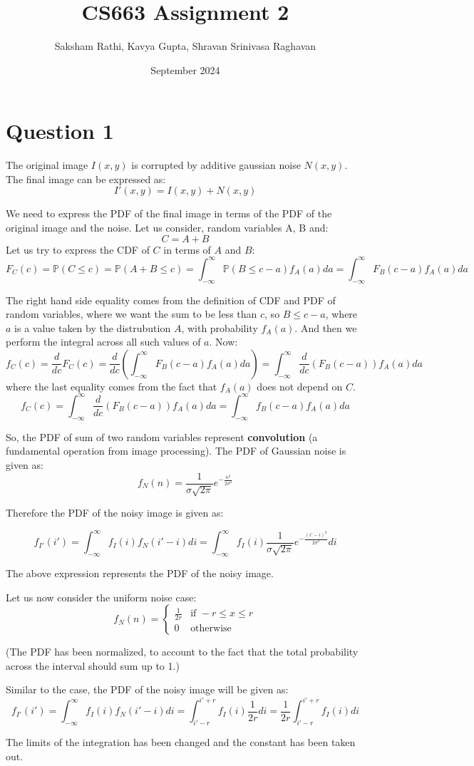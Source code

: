 \documentclass[12pt]{article}
\title{{\bf CS663 Assignment 2}}
\author{Saksham Rathi, Kavya Gupta, Shravan Srinivasa Raghavan}
\date{September 2024}
\begin{document}
\maketitle
\clearpage
\tableofcontents
\clearpage
\section*{Question 1}
The original image $I(x, y)$ is corrupted by additive gaussian noise $N(x, y)$. The final image can be expressed as:
\[I'(x, y) = I(x, y) + N(x, y)\]

We need to express the PDF of the final image in terms of the PDF of the original image and the noise. Let us consider, random variables A, B and:
\[C = A + B\]
Let us try to express the CDF of $C$ in terms of $A$ and $B$:
\[F_C(c) = \mathbb{P}(C \leq c) = \mathbb{P}(A+ B \leq c) = \int_{-\infty}^\infty \mathbb{P}(B \leq c - a)f_A(a)da = \int_{-\infty}^\infty F_B(c-a)f_A(a)da\]

The right hand side equality comes from the definition of CDF and PDF of random variables, where we want the sum to be less than $c$, so $B\leq c-a$, where $a$ is a value taken by the distrubution $A$, with probability $f_A(a)$. And then we perform the integral across all such values of $a$. Now:
\[f_C(c) = \frac{d}{dc}F_C(c) = \frac{d}{dc}\left(\int_{-\infty}^\infty F_B(c-a)f_A(a)da\right) = \int_{-\infty}^\infty \frac{d}{dc}\left(F_B(c-a)\right)f_A(a)da\]
where the last equality comes from the fact that $f_A(a)$ does not depend on $C$.
\[f_C(c) = \int_{-\infty}^\infty \frac{d}{dc}(F_B(c-a))f_A(a)da = \int_{-\infty}^\infty f_B(c-a)f_A(a)da\]

So, the PDF of sum of two random variables represent \textbf{convolution} (a fundamental operation from image processing). The PDF of Gaussian noise is given as:
\[f_N(n) = \frac{1}{\sigma\sqrt{2\pi}}e^{-\frac{n^2}{2\sigma^2}}\]

Therefore the PDF of the noisy image is given as:

\[f_{I'}(i') = \int_{-\infty}^\infty f_I(i)f_N(i'-i)di = \int_{-\infty}^\infty f_I(i)\frac{1}{\sigma\sqrt{2\pi}}e^{-\frac{(i'-i)^2}{2\sigma^2}}di\]

The above expression represents the PDF of the noisy image.


Let us now consider the uniform noise case:
\[f_N(n) = 
\begin{cases} 
    \frac{1}{2r} & \text{if } -r \leq x \leq r \\
    0  & \text{otherwise}
\end{cases}\]

(The PDF has been normalized, to account to the fact that the total probability across the interval should sum up to 1.)


Similar to the case, the PDF of the noisy image will be given as:
\[f_{I'}(i') = \int_{-\infty}^\infty f_I(i)f_N(i'-i)di = \int_{i'-r}^{i'+r} f_I(i)\frac{1}{2r}di = \frac{1}{2r}\int_{i'-r}^{i'+r} f_I(i)di\]


The limits of the integration has been changed and the constant has been taken out.
\end{document}
